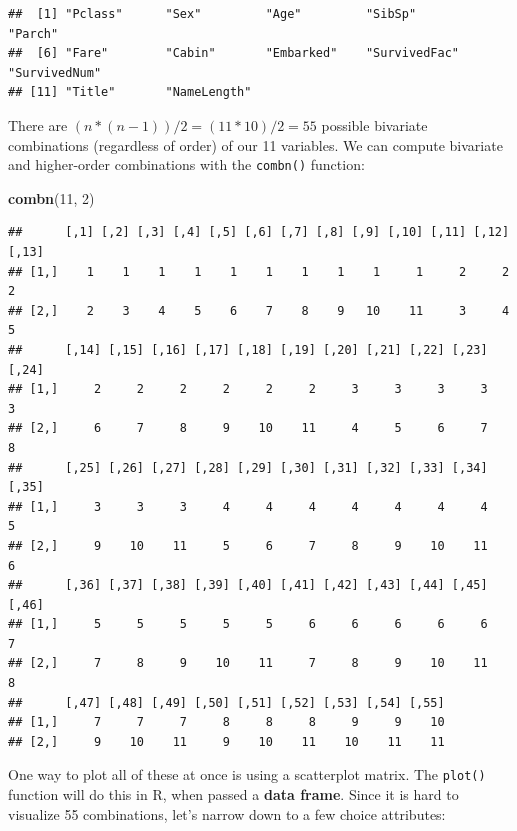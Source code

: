 \documentclass[]{article}
\newenvironment{Shaded}{\begin{snugshade}}{\end{snugshade}}
\newcommand{\KeywordTok}[1]{\textcolor[rgb]{0.13,0.29,0.53}{\textbf{#1}}}
\newcommand{\DecValTok}[1]{\textcolor[rgb]{0.00,0.00,0.81}{#1}}
\newcommand{\StringTok}[1]{\textcolor[rgb]{0.31,0.60,0.02}{#1}}
\newcommand{\OperatorTok}[1]{\textcolor[rgb]{0.81,0.36,0.00}{\textbf{#1}}}
\newcommand{\NormalTok}[1]{#1}
\begin{document}
\begin{verbatim}
##  [1] "Pclass"      "Sex"         "Age"         "SibSp"       "Parch"      
##  [6] "Fare"        "Cabin"       "Embarked"    "SurvivedFac" "SurvivedNum"
## [11] "Title"       "NameLength"
\end{verbatim}

There are \((n * (n-1)) / 2 = (11 * 10)/2 = 55\) possible bivariate
combinations (regardless of order) of our 11 variables. We can compute
bivariate and higher-order combinations with the \texttt{combn()}
function:

\begin{Shaded}
\begin{Highlighting}[]
\KeywordTok{combn}\NormalTok{(}\DecValTok{11}\NormalTok{, }\DecValTok{2}\NormalTok{)}
\end{Highlighting}
\end{Shaded}

\begin{verbatim}
##      [,1] [,2] [,3] [,4] [,5] [,6] [,7] [,8] [,9] [,10] [,11] [,12] [,13]
## [1,]    1    1    1    1    1    1    1    1    1     1     2     2     2
## [2,]    2    3    4    5    6    7    8    9   10    11     3     4     5
##      [,14] [,15] [,16] [,17] [,18] [,19] [,20] [,21] [,22] [,23] [,24]
## [1,]     2     2     2     2     2     2     3     3     3     3     3
## [2,]     6     7     8     9    10    11     4     5     6     7     8
##      [,25] [,26] [,27] [,28] [,29] [,30] [,31] [,32] [,33] [,34] [,35]
## [1,]     3     3     3     4     4     4     4     4     4     4     5
## [2,]     9    10    11     5     6     7     8     9    10    11     6
##      [,36] [,37] [,38] [,39] [,40] [,41] [,42] [,43] [,44] [,45] [,46]
## [1,]     5     5     5     5     5     6     6     6     6     6     7
## [2,]     7     8     9    10    11     7     8     9    10    11     8
##      [,47] [,48] [,49] [,50] [,51] [,52] [,53] [,54] [,55]
## [1,]     7     7     7     8     8     8     9     9    10
## [2,]     9    10    11     9    10    11    10    11    11
\end{verbatim}

One way to plot all of these at once is using a scatterplot matrix. The
\texttt{plot()} function will do this in R, when passed a \textbf{data
frame}. Since it is hard to visualize 55 combinations, let's narrow down
to a few choice attributes:

\begin{Shaded}
\end{Shaded}
\end{document}
